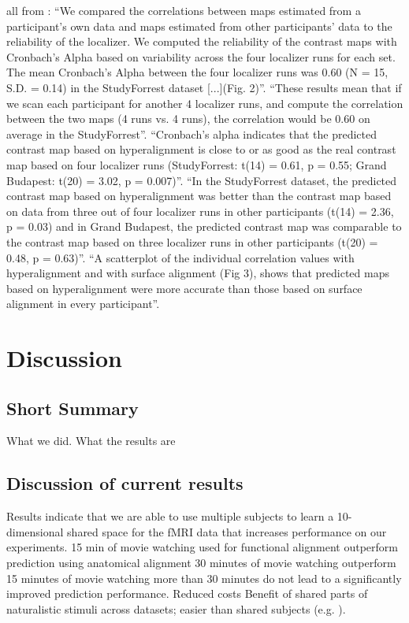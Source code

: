 all from \citep{jiahui2020predicting}: ``We compared the correlations between
maps estimated from a participant's own data and maps estimated from other
participants' data to the reliability of the localizer. We computed the
reliability of the contrast maps with Cronbach's Alpha based on variability
across the four localizer runs for each set. The mean Cronbach's Alpha between
the four localizer runs was 0.60 (N = 15, S.D. = 0.14) in the StudyForrest
dataset [...](Fig. 2)''.
%
``These results mean that if we scan each participant for another 4 localizer
runs, and compute the correlation between the two maps (4 runs vs. 4 runs), the
correlation would be 0.60 on average in the StudyForrest''.
%
``Cronbach's alpha indicates that the predicted contrast map based on
hyperalignment is close to or as good as the real contrast map based on four
localizer runs (StudyForrest: t(14) = 0.61, p = 0.55; Grand Budapest: t(20) =
3.02, p = 0.007)''.
%
``In the StudyForrest dataset, the predicted contrast map based on
hyperalignment was better than the contrast map based on data from three out of
four localizer runs in other participants (t(14) = 2.36, p = 0.03) and in Grand
Budapest, the predicted contrast map was comparable to the contrast map based on
three localizer runs in other participants (t(20) = 0.48, p = 0.63)''.
%
``A scatterplot of the individual correlation values with hyperalignment and
with surface alignment (Fig 3), shows that predicted maps based on
hyperalignment were more accurate than those based on surface alignment in every
participant''.


\section{Discussion}



\subsection{Short Summary}

What we did. What the results are

\subsection{Discussion of current results}

Results indicate that we are able to use multiple subjects to learn a
10-dimensional shared space for the fMRI data that increases performance on our
experiments.
%
15 min of movie watching used for functional alignment outperform prediction
using anatomical alignment
%
30 minutes of movie watching outperform 15 minutes of movie watching
%
more than 30 minutes do not lead to a significantly improved prediction
performance.
%
Reduced costs
%
Benefit of shared parts of naturalistic stimuli across datasets; easier than
shared subjects (e.g. \citep{zhang2018transfer}).

